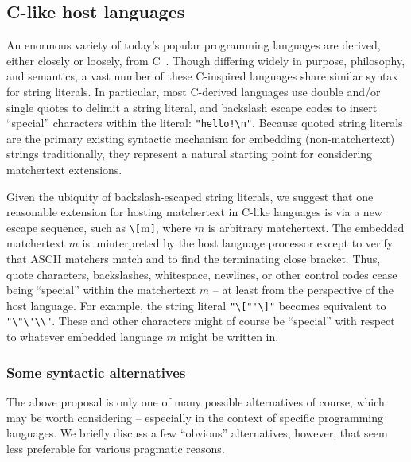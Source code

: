 \subsection{C-like host languages}
\label{sec:host:c}

An enormous variety of today's popular programming languages
are derived, either closely or loosely, from C~\cite{kernighan88c}.
Though differing widely in purpose, philosophy, and semantics,
a vast number of these C-inspired languages share similar syntax
for string literals.
In particular, most C-derived languages use
double and/or single quotes to delimit a string literal,
and backslash escape codes to insert ``special'' characters within the literal:
\eg \verb|"hello!\n"|.
Because quoted string literals
are the primary existing syntactic mechanism
for embedding (non-matchertext) strings traditionally,
they represent a natural starting point for considering matchertext extensions.

Given the ubiquity of backslash-escaped string literals,
we suggest that one reasonable extension for hosting matchertext
in C-like languages is via a new escape sequence,
such as \verb|\[|m\verb|]|,
where $m$ is arbitrary matchertext.
The embedded matchertext $m$ is uninterpreted by the host language processor
except to verify that ASCII matchers match
and to find the terminating close bracket.
Thus, quote characters, backslashes, whitespace, newlines,
or other control codes cease being ``special'' within the matchertext $m$ --
at least from the perspective of the host language.
For example, the string literal \verb|"\["'\]"|
becomes equivalent to \verb|"\"\'\\"|.
These and other characters might of course be ``special'' with respect to
whatever embedded language $m$ might be written in.

\subsubsection{Some syntactic alternatives}

The above proposal is only one of many possible alternatives of course,
which may be worth considering --
especially in the context of specific programming languages.
We briefly discuss a few ``obvious'' alternatives, however,
that seem less preferable for various pragmatic reasons.

